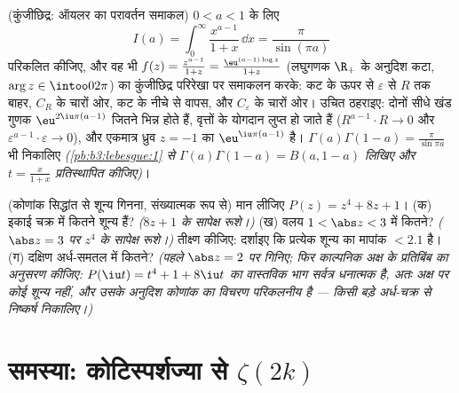 \begin{exercise}[$\star\star\star$]\label{exo:b3:residues:11}
(कुंजीछिद्र: ऑयलर का परावर्तन समाकल) $0 < a < 1$ के लिए
\[
I(a) = \int_0^{\infty}\frac{x^{a-1}}{1 + x}\,\dd x =
\frac{\pi}{\sin(\pi a)}
\]
परिकलित कीजिए, और वह भी $f(z) = \frac{z^{a-1}}{1+z} =
\frac{\eu^{(a-1)\log z}}{1 + z}$ (लघुगणक $\R_+$ के अनुदिश कटा, $\arg z \in \intoo0{2\pi}$)
का कुंजीछिद्र परिरेखा पर समाकलन करके: कट के ऊपर से $\varepsilon$ से $R$
तक बाहर, $C_R$ के चारों ओर, कट के नीचे से वापस, और $C_\varepsilon$ के चारों
ओर। उचित ठहराइए: दोनों सीधे खंड गुणक $\eu^{2\iu\pi(a-1)}$ जितने भिन्न होते हैं,
वृत्तों के योगदान लुप्त हो जाते हैं ($R^{a-1}\cdot R \to 0$ और $\varepsilon^{a-1}\cdot\varepsilon \to 0$), और एकमात्र
ध्रुव $z = -1$ का  $\eu^{\iu\pi(a - 1)}$ है। $\Gamma(a)\Gamma(1 - a) = \frac\pi{\sin\pi a}$ भी निकालिए \emph{(\cref{pb:b3:lebesgue:1} से
$\Gamma(a)\Gamma(1-a) = B(a, 1-a)$ लिखिए और $t =
\frac{x}{1+x}$ प्रतिस्थापित कीजिए)}।
\end{exercise}

\begin{exercise}[$\star\star$]\label{exo:b3:residues:12}
(कोणांक सिद्धांत से शून्य गिनना, संख्यात्मक रूप से) मान लीजिए
$P(z) = z^4 + 8z + 1$।
(क) इकाई चक्र में कितने शून्य हैं? \emph{($8z + 1$ के सापेक्ष रूशे।)}
(ख) वलय $1 < \abs z < 3$ में कितने? \emph{($\abs z = 3$ पर $z^4$ के सापेक्ष रूशे।)}
तीक्ष्ण कीजिए: दर्शाइए कि प्रत्येक शून्य का मापांक $< 2.1$ है।
(ग) दक्षिण अर्ध-समतल में कितने? \emph{(पहले $\abs z = 2$ पर गिनिए; फिर
काल्पनिक अक्ष के प्रतिबिंब का अनुसरण कीजिए: $P(\iu t) = t^4 + 1 + 8\iu t$ का वास्तविक भाग
सर्वत्र धनात्मक है, अतः अक्ष पर कोई शून्य नहीं, और उसके अनुदिश
कोणांक का विचरण परिकलनीय है --- किसी बड़े अर्ध-चक्र से निष्कर्ष
निकालिए।)}
\end{exercise}

\section{समस्या: कोटिस्पर्शज्या से
\texorpdfstring{$\zeta(2k)$}{ZETA(2k)}}

